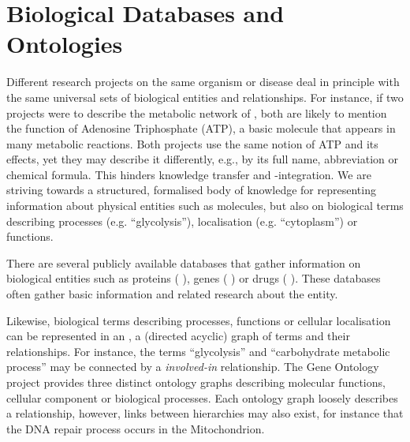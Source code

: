 \documentclass[
	fontsize=10pt, %
	twoside=false, %
	secnumdepth=1, %
  toc=indentunnumbered %
]{kaobook}
\begin{document}
\section{Biological Databases and Ontologies}
\label{sec:ontologies}



Different research projects on the same organism or disease deal in principle
with the same universal sets of biological entities and relationships. For
instance, if two projects were to describe the metabolic network of \ecoli, both
are likely to mention the function of Adenosine Triphosphate (ATP), a basic
molecule that appears in many metabolic reactions. Both projects use the same
notion of ATP and its effects, yet they may describe it differently, e.g., by
its full name, abbreviation or
chemical formula. This hinders knowledge transfer and -integration. We are
striving towards a structured, formalised body of knowledge for representing
information about physical entities such as molecules, but also on biological terms
describing processes (e.g. ``glycolysis''), localisation (e.g. ``cytoplasm'') or
functions.

There are several publicly available databases that gather information on
biological entities such as proteins (
\cite{theuniprotconsortium_UniProtUniversalProtein_2021}), genes
( \cite{maglott_EntrezGeneGenecentered_2005}) or drugs
( \cite{wishart_DrugBankKnowledgebaseDrugs_2008}). These
databases often gather basic information and related research about the entity.

Likewise, biological terms describing processes, functions or cellular
localisation can be represented in an , a (directed acyclic) graph
of terms and their relationships. For instance, the terms ``glycolysis'' and
``carbohydrate metabolic process'' may be connected by a \textit{involved-in}
relationship. The Gene Ontology project \cite{ashburner_GeneOntologyTool_2000}
provides three distinct ontology graphs describing molecular functions, cellular
component or biological processes. Each ontology graph loosely describes a
relationship, however, links between hierarchies may also exist, for instance
that the DNA repair process occurs in the Mitochondrion.
\end{document}
